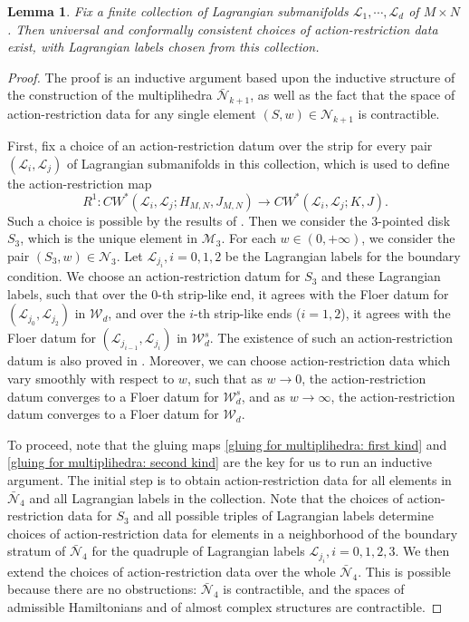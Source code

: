 \documentclass{amsart}
\newtheorem{lemma}[theorem]{Lemma}
\numberwithin{equation}{section}
\numberwithin{figure}{section}
\begin{document}
\begin{lemma}
	Fix a finite collection of Lagrangian submanifolds $\mathcal{L}_{1}, \cdots, \mathcal{L}_{d}$ of $M \times N$. Then universal and conformally consistent choices of action-restriction data exist, with Lagrangian labels chosen from this collection.
\end{lemma}
\begin{proof}
	The proof is an inductive argument based upon the inductive structure of the construction of the multiplihedra $\bar{\mathcal{N}}_{k+1}$, as well as the fact that the space of action-restriction data for any single element $(S, w) \in \mathcal{N}_{k+1}$ is contractible. \par
	First, fix a choice of an action-restriction datum over the strip for every pair $(\mathcal{L}_{i}, \mathcal{L}_{j})$ of Lagrangian submanifolds in this collection, which is used to define the action-restriction map
\begin{equation}
R^{1}: CW^{*}(\mathcal{L}_{i}, \mathcal{L}_{j}; H_{M, N}, J_{M, N}) \to CW^{*}(\mathcal{L}_{i}, \mathcal{L}_{j}; K, J).
\end{equation}
Such a choice is possible by the results of \cite{Gao1}.
Then we consider the $3$-pointed disk $S_{3}$, which is the unique element in $\mathcal{M}_{3}$. For each $w \in (0, +\infty)$, we consider the pair $(S_{3}, w) \in \mathcal{N}_{3}$. Let $\mathcal{L}_{j_{i}}, i = 0, 1, 2$ be the Lagrangian labels for the boundary condition. We choose an action-restriction datum for $S_{3}$ and these Lagrangian labels, such that over the $0$-th strip-like end, it agrees with the Floer datum for $(\mathcal{L}_{j_{0}}, \mathcal{L}_{j_{2}})$ in $\mathcal{W}_{d}$, and over the $i$-th strip-like ends ($i=1, 2$), it agrees with the Floer datum for $(\mathcal{L}_{j_{i-1}}, \mathcal{L}_{j_{i}})$ in $\mathcal{W}^{s}_{d}$. The existence of such an action-restriction datum is also proved in \cite{Gao1}. Moreover, we can choose action-restriction data which vary smoothly with respect to $w$, such that as $w \to 0$, the action-restriction datum converges to a Floer datum for $\mathcal{W}^{s}_{d}$, and as $w \to \infty$, the action-restriction datum converges to a Floer datum for $\mathcal{W}_{d}$. \par
	To proceed, note that the gluing maps \eqref{gluing for multiplihedra: first kind} and \eqref{gluing for multiplihedra: second kind} are the key for us to run an inductive argument. The initial step is to obtain action-restriction data for all elements in $\bar{\mathcal{N}}_{4}$ and all Lagrangian labels in the collection. Note that the choices of action-restriction data for $S_{3}$ and all possible triples of Lagrangian labels determine choices of action-restriction data for elements in a neighborhood of the boundary stratum of $\bar{\mathcal{N}}_{4}$ for the quadruple of Lagrangian labels $\mathcal{L}_{j_{i}}, i = 0, 1, 2, 3$. We then extend the choices of action-restriction data over the whole $\bar{\mathcal{N}}_{4}$. This is possible because there are no obstructions: $\bar{\mathcal{N}}_{4}$ is contractible, and the spaces of admissible Hamiltonians and of almost complex structures are contractible. \par

\end{proof}
\end{document}
